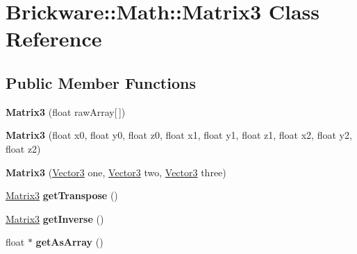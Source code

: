 \hypertarget{classBrickware_1_1Math_1_1Matrix3}{}\section{Brickware\+:\+:Math\+:\+:Matrix3 Class Reference}
\label{classBrickware_1_1Math_1_1Matrix3}
\subsection*{Public Member Functions}
\begin{DoxyCompactItemize}
\item 
\hypertarget{classBrickware_1_1Math_1_1Matrix3_aaa47d14e396ef6880da428fc986cccfe}{}{\bfseries Matrix3} (float raw\+Array\mbox{[}$\,$\mbox{]})\label{classBrickware_1_1Math_1_1Matrix3_aaa47d14e396ef6880da428fc986cccfe}

\item 
\hypertarget{classBrickware_1_1Math_1_1Matrix3_a4eda12bd80ad6cc490b9ba558792c172}{}{\bfseries Matrix3} (float x0, float y0, float z0, float x1, float y1, float z1, float x2, float y2, float z2)\label{classBrickware_1_1Math_1_1Matrix3_a4eda12bd80ad6cc490b9ba558792c172}

\item 
\hypertarget{classBrickware_1_1Math_1_1Matrix3_a8bf0d9acde4e33b6b3e00193c6d7e963}{}{\bfseries Matrix3} (\hyperlink{classBrickware_1_1Math_1_1Vector3}{Vector3} one, \hyperlink{classBrickware_1_1Math_1_1Vector3}{Vector3} two, \hyperlink{classBrickware_1_1Math_1_1Vector3}{Vector3} three)\label{classBrickware_1_1Math_1_1Matrix3_a8bf0d9acde4e33b6b3e00193c6d7e963}

\item 
\hypertarget{classBrickware_1_1Math_1_1Matrix3_abee370adcb49bef908ab5aff738dff04}{}\hyperlink{classBrickware_1_1Math_1_1Matrix3}{Matrix3} {\bfseries get\+Transpose} ()\label{classBrickware_1_1Math_1_1Matrix3_abee370adcb49bef908ab5aff738dff04}

\item 
\hypertarget{classBrickware_1_1Math_1_1Matrix3_a74de99502516d87092f83e01a12f1751}{}\hyperlink{classBrickware_1_1Math_1_1Matrix3}{Matrix3} {\bfseries get\+Inverse} ()\label{classBrickware_1_1Math_1_1Matrix3_a74de99502516d87092f83e01a12f1751}

\item 
\hypertarget{classBrickware_1_1Math_1_1Matrix3_a5dae470b6e018b05bfa70d6375b66a62}{}float $\ast$ {\bfseries get\+As\+Array} ()\label{classBrickware_1_1Math_1_1Matrix3_a5dae470b6e018b05bfa70d6375b66a62}


\end{DoxyCompactItemize}
